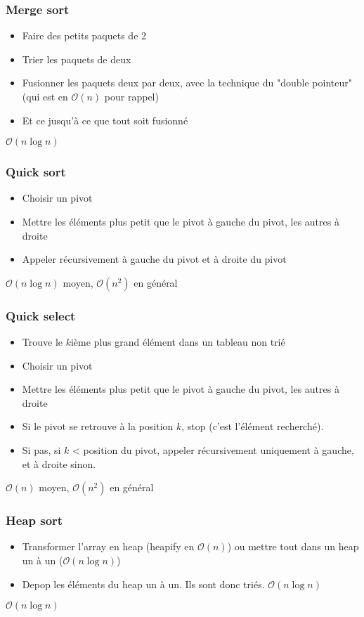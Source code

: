 \documentclass[8pt,aspectratio=169]{beamer}
\begin{document}
\begin{frame}
\frametitle{Merge sort}
\begin{itemize}
	\item Faire des petits paquets de 2
	\item Trier les paquets de deux
	\item Fusionner les paquets deux par deux, avec la technique du "double pointeur" (qui est en $\mathcal{O}(n)$ pour rappel)
	\item Et ce jusqu'à ce que tout soit fusionné
\end{itemize}
$\mathcal{O}(n\log n)$
\end{frame}

\begin{frame}
\frametitle{Quick sort}
\begin{itemize}
	\item Choisir un pivot
	\item Mettre les éléments plus petit que le pivot à gauche du pivot, les autres à droite
	\item Appeler récursivement à gauche du pivot et à droite du pivot
\end{itemize}
$\mathcal{O}(n\log n)$ moyen, $\mathcal{O}(n^2)$ en général
\end{frame}

\begin{frame}
\frametitle{Quick select}
\begin{itemize}
	\item Trouve le $k$ième plus grand élément dans un tableau non trié
	\item Choisir un pivot
	\item Mettre les éléments plus petit que le pivot à gauche du pivot, les autres à droite
	\item Si le pivot se retrouve à la position $k$, stop (c'est l'élément recherché).
	\item Si pas, si $k$ < position du pivot, appeler récursivement uniquement à gauche, et à droite sinon.
\end{itemize}
$\mathcal{O}(n)$ moyen, $\mathcal{O}(n^2)$ en général
\end{frame}

\begin{frame}
\frametitle{Heap sort}
\begin{itemize}
	\item Transformer l'array en heap (heapify en $\mathcal{O}(n)$) ou mettre tout dans un heap un à un ($\mathcal{O}(n\log n)$)
	\item Depop les éléments du heap un à un. Ils sont donc triés. $\mathcal{O}(n\log n)$
\end{itemize}
$\mathcal{O}(n\log n)$
\end{frame}
\end{document}
